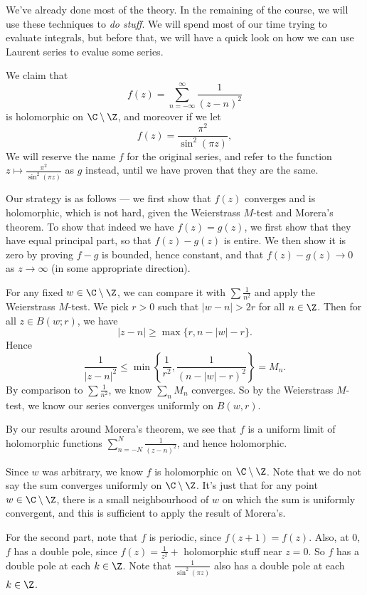 \documentclass[a4paper]{article}
\begin{document}
We've already done most of the theory. In the remaining of the course, we will use these techniques to \emph{do stuff}. We will spend most of our time trying to evaluate integrals, but before that, we will have a quick look on how we can use Laurent series to evalue some series.

\begin{eg}
  We claim that
  \[
    f(z) = \sum_{n = -\infty}^\infty \frac{1}{(z - n)^2}
  \]
  is holomorphic on $\C \setminus \Z$, and moreover if we let
  \[
    f(z) = \frac{\pi^2}{\sin^2(\pi z)},
  \]
  We will reserve the name $f$ for the original series, and refer to the function $z \mapsto \frac{\pi^2}{\sin^2 (\pi z)}$ as $g$ instead, until we have proven that they are the same.

  Our strategy is as follows --- we first show that $f(z)$ converges and is holomorphic, which is not hard, given the Weierstrass $M$-test and Morera's theorem. To show that indeed we have $f(z) = g(z)$, we first show that they have equal principal part, so that $f(z) - g(z)$ is entire. We then show it is zero by proving $f - g$ is bounded, hence constant, and that $f(z) - g(z) \to 0$ as $z \to \infty$ (in some appropriate direction).

  For any fixed $w \in \C \setminus \Z$, we can compare it with $\sum \frac{1}{n^2}$ and apply the Weierstrass $M$-test. We pick $r > 0$ such that $|w - n| > 2r$ for all $n \in \Z$. Then for all $z \in B(w; r)$, we have
  \[
    |z - n| \geq \max\{r, n - |w| - r\}.
  \]
  Hence
  \[
    \frac{1}{|z - n|^2} \leq \min\left\{\frac{1}{r^2}, \frac{1}{(n - |w| - r)^2}\right\} = M_n.
  \]
  By comparison to $\sum \frac{1}{n^2}$, we know $\sum_n M_n$ converges. So by the Weierstrass $M$-test, we know our series converges uniformly on $B(w, r)$.

  By our results around Morera's theorem, we see that $f$ is a uniform limit of holomorphic functions $\sum_{n = -N}^N \frac{1}{(z - n)^2}$, and hence holomorphic.

  Since $w$ was arbitrary, we know $f$ is holomorphic on $\C \setminus \Z$. Note that we do not say the sum converges uniformly on $\C \setminus \Z$. It's just that for any point $w \in \C \setminus \Z$, there is a small neighbourhood of $w$ on which the sum is uniformly convergent, and this is sufficient to apply the result of Morera's.

  For the second part, note that $f$ is periodic, since $f(z + 1) = f(z)$. Also, at $0$, $f$ has a double pole, since $f(z) = \frac{1}{z^2} + $ holomorphic stuff near $z = 0$. So $f$ has a double pole at each $k \in \Z$. Note that $\frac{1}{\sin^2 (\pi z)}$ also has a double pole at each $k \in \Z$.


\end{eg}
\end{document}
